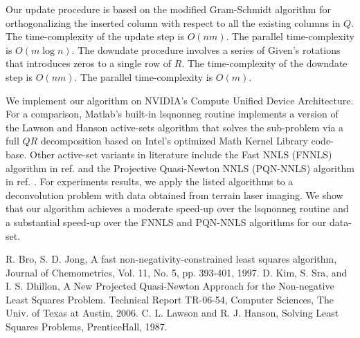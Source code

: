 \documentclass{report}
\begin{document}
Our update procedure is based on the modified Gram-Schmidt algorithm for
orthogonalizing the inserted column with respect to all the existing
columns in $Q$. The time-complexity of the update step is $O(nm)$. The
parallel time-complexity is $O(m\log{n})$. The downdate procedure
involves a series of Given's rotations that introduces zeros to a single
row of $R$. The time-complexity of the downdate step is $O(nm)$. The
parallel time-complexity is $O(m)$.

We implement our algorithm on NVIDIA's Compute Unified Device
Architecture. For a comparison, Matlab's built-in lsqnonneg routine
implements a version of the Lawson and Hanson active-sets algorithm that
solves the sub-problem via a full $QR$ decomposition based on Intel's
optimized Math Kernel Library code-base. Other active-set variants in
literature include the Fast NNLS (FNNLS) algorithm in ref. \cite{BIB_BRO}
and the Projective Quasi-Newton NNLS (PQN-NNLS) algorithm in ref.
\cite{BIB_KIM}. For experiments results, we apply the listed algorithms
to a deconvolution problem with data obtained from terrain laser imaging.
We show that our algorithm achieves a moderate speed-up over the
lsqnonneg routine and a substantial speed-up over the FNNLS and PQN-NNLS
algorithms for our data-set.

\begin{thebibliography}{10}
 R. Bro, S. D. Jong, A fast non-negativity-constrained
least squares algorithm, Journal of Chemometrics, Vol. 11, No. 5, pp.
393-401, 1997.
 D. Kim, S. Sra, and I. S. Dhillon, A New Projected
Quasi-Newton Approach for the Non-negative Least Squares Problem.
Technical Report TR-06-54, Computer Sciences, The Univ. of Texas at
Austin, 2006.
 C. L. Lawson and R. J. Hanson, Solving Least Squares
Problems, PrenticeHall, 1987.
\end{thebibliography}
\end{document}
